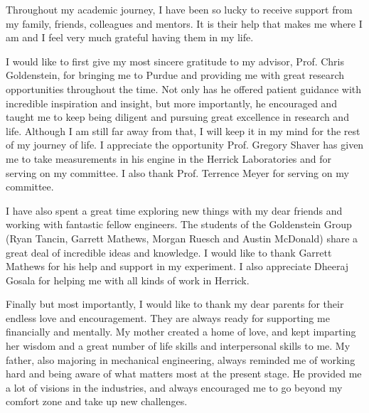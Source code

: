 \begin{acknowledgments}
Throughout my academic journey, I have been so lucky to receive support from my family, friends, colleagues and mentors. It is their help that makes me where I am and I feel very much grateful having them in my life. 

I would like to first give my most sincere gratitude to my advisor, Prof. Chris Goldenstein, for bringing me to Purdue and providing me with great research opportunities throughout the time. Not only has he offered patient guidance with incredible inspiration and insight, but more importantly, he encouraged and taught me to keep being diligent and pursuing great excellence in research and life. Although I am still far away from that, I will keep it in my mind for the rest of my journey of life. I appreciate the opportunity Prof. Gregory Shaver has given me to take measurements in his engine in the Herrick Laboratories and for serving on my committee. I also thank Prof. Terrence Meyer for serving on my committee. 

I have also spent a great time exploring new things with my dear friends and working with fantastic fellow engineers. The students of the Goldenstein Group (Ryan Tancin, Garrett Mathews, Morgan Ruesch and Austin McDonald) share a great deal of incredible ideas and knowledge. I would like to thank Garrett Mathews for his help and support in my experiment. I also appreciate Dheeraj Gosala for helping me with all kinds of work in Herrick.

Finally but most importantly, I would like to thank my dear parents for their endless love and encouragement. They are always ready for supporting me financially and mentally. My mother created a home of love, and kept imparting her wisdom and a great number of life skills and interpersonal skills to me. My father, also majoring in mechanical engineering, always reminded me of working hard and being aware of what matters most at the present stage. He provided me a lot of visions in the industries, and always encouraged me to go beyond my comfort zone and take up new challenges.

\end{acknowledgments}


